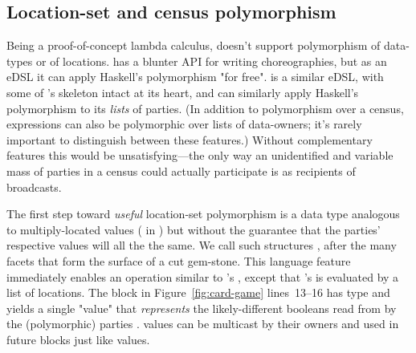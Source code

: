 \subsection{Location-set and census polymorphism}\label{sec:located-faceted}

Being a proof-of-concept lambda calculus, \HLSCentral doesn't support polymorphism of data-types
or of locations.
\HasChor has a blunter API for writing choreographies, but as an eDSL it can apply
Haskell's polymorphism "for free".
\MultiChor is a similar eDSL, with some of \HasChor's skeleton intact at its heart,
and can similarly apply Haskell's polymorphism to its \emph{lists} of parties.
(In addition to polymorphism over a census, \MultiChor expressions
can also be polymorphic over lists of data-owners;
it's rarely important to distinguish between these features.)
Without complementary features this would be
unsatisfying---the only way an unidentified and variable mass of parties in a census could actually
participate is as recipients of broadcasts.

The first step toward \emph{useful} location-set polymorphism is a data type analogous to
multiply-located values ( in \MultiChor)
but without the guarantee that the parties' respective values will all the the same.
We call such structures , after the many facets that form
the surface of a cut gem-stone.
This language feature immediately enables an operation similar to \HasChor's ,
except that \MultiChor's  is evaluated by a list of locations.
The block in Figure~\ref{fig:card-game} lines~13--16 has type 
and yields a single "value" that \emph{represents} the likely-different booleans read from
 by the (polymorphic) parties .
 values can be multicast by their owners
and used in future  blocks
just like  values.

